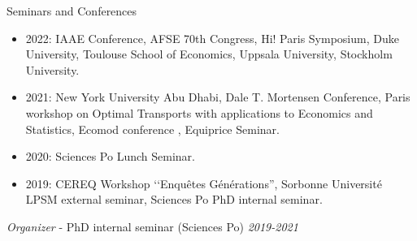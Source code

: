 \documentclass{resume} %
\begin{document}

\begin{rSection}{Seminars and Conferences}
\begin{itemize}
  \item 2022: IAAE Conference, AFSE 70th Congress, Hi! Paris Symposium, Duke University, Toulouse School of Economics, Uppsala University, Stockholm University.
  \item 2021: New York University Abu Dhabi, Dale T. Mortensen Conference, Paris workshop on Optimal Transports with applications to Economics and Statistics, Ecomod conference , Equiprice Seminar.
  \item 2020: Sciences Po Lunch Seminar.
  \item 2019: CEREQ Workshop ‘‘Enquêtes Générations'', Sorbonne Université LPSM external seminar, Sciences Po PhD internal seminar.
\end{itemize}

{\em Organizer} - PhD internal seminar (Sciences Po) \hfill {\em 2019-2021}

\end{rSection}
\end{document}
